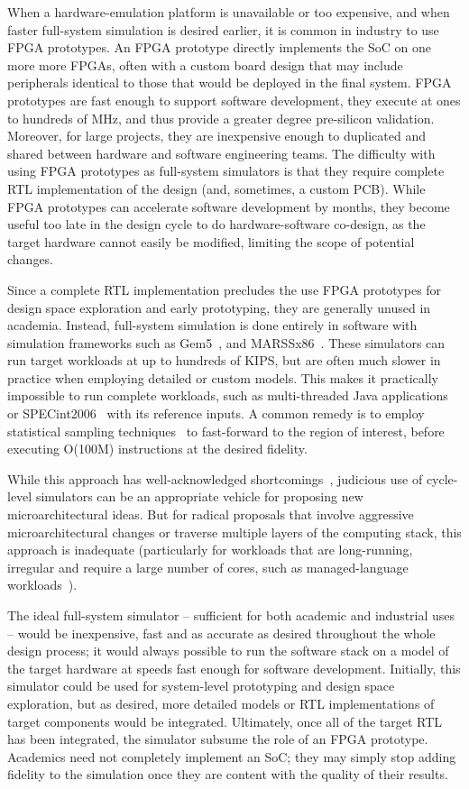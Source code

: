 When a hardware-emulation platform is unavailable or too expensive, and when
faster full-system simulation is desired earlier, it is common in industry to
use FPGA prototypes. An FPGA prototype directly implements the SoC on
one more more FPGAs, often with a custom board design that may include
peripherals identical to those that would be deployed in the final system. FPGA
prototypes are fast enough to support software development, they execute at ones to hundreds of
MHz, and thus provide a greater degree pre-silicon validation. Moreover, for large
projects, they are inexpensive enough to duplicated and shared between hardware
and software engineering teams.  The difficulty with using FPGA prototypes as
full-system simulators is that they require complete RTL implementation of the
design (and, sometimes, a custom PCB). While FPGA prototypes can accelerate
software development by months, they become useful too late in the design cycle
to do hardware-software co-design, as the target hardware cannot easily be
modified, limiting the scope of potential changes.

Since a complete RTL implementation precludes the use FPGA prototypes for
design space exploration and early prototyping, they are generally unused in
academia. Instead, full-system simulation is done entirely in software with
simulation frameworks such as Gem5~\cite{gem5}, and MARSSx86~\cite{marssx86}.
These simulators can run target workloads at up to hundreds of KIPS, but are
often much slower in practice when employing detailed or custom models. This
makes it practically impossible to run complete workloads, such as
multi-threaded Java applications or SPECint2006~\cite{spec} with its reference
inputs. A common remedy is to employ statistical sampling
techniques~\cite{smarts} to fast-forward to the region of interest, before
executing O(100M) instructions at the desired fidelity.

While this approach has well-acknowledged shortcomings~\cite{gem5error},
judicious use of cycle-level simulators can be an appropriate vehicle for
proposing new microarchitectural ideas. But for radical proposals that involve
aggressive microarchitectural changes or traverse multiple layers of the
computing stack, this approach is inadequate (particularly for workloads that
are long-running, irregular and require a large number of cores, such as
managed-language workloads~\cite{MicroSimPanel}).

The ideal full-system simulator -- sufficient for both academic and industrial
uses -- would be inexpensive, fast and as accurate as desired throughout the
whole design process; it would always possible to run the software stack on a
model of the target hardware at speeds fast enough for software development.
Initially, this simulator could be used for system-level prototyping and design
space exploration, but as desired, more detailed models or RTL implementations
of target components would be integrated. Ultimately, once all of the target
RTL has been integrated, the simulator subsume the role of an FPGA prototype.
Academics need not completely implement an SoC; they may simply stop adding
fidelity to the simulation once they are content with the quality of their
results.

